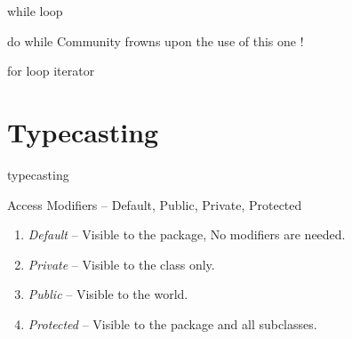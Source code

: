 \documentclass[11pt]{beamer}
\begin{document}
\begin{frame}{while loop}

\end{frame}



\begin{frame}{do while}
\huge \color{javared} Community frowns upon the use of this one !
\end{frame}



\begin{frame}{for loop iterator}

\end{frame}


\section{Typecasting}
\begin{frame}{typecasting}

\end{frame}



\begin{frame}{Access Modifiers -- Default, Public, Private, Protected}

\begin{enumerate}
\item \emph{Default} -- Visible to the package,  No modifiers are needed.
\item \emph{Private} -- Visible to the class only.
\item \emph{Public} -- Visible to the world.
\item \emph{Protected} -- Visible to the package and all subclasses.    
\end{enumerate}
\end{frame}
\end{document}
